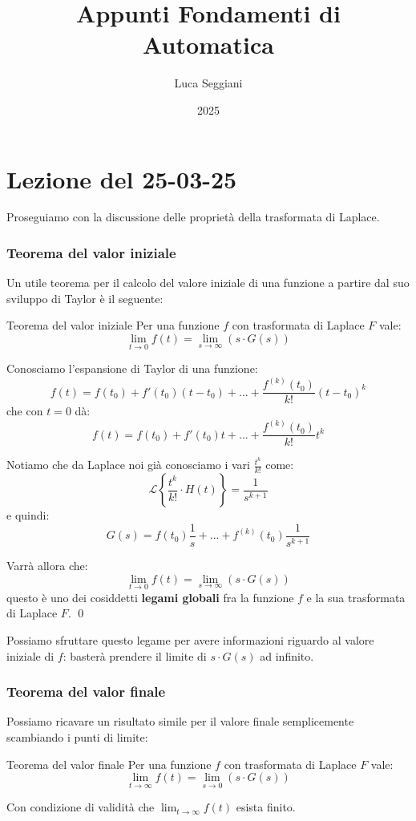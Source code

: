\documentclass[a4paper,11pt]{article}
\title{Appunti Fondamenti di Automatica}
\author{Luca Seggiani}
\date{2025}
\begin{document}
\section{Lezione del 25-03-25}

\thispagestyle{empty}
\pagestyle{fancy}

Proseguiamo con la discussione delle proprietà della trasformata di Laplace.

\subsubsection{Teorema del valor iniziale}
Un utile teorema per il calcolo del valore iniziale di una funzione a partire dal suo sviluppo di Taylor è il seguente:
\begin{theorem}{Teorema del valor iniziale}
	Per una funzione $f$ con trasformata di Laplace $F$ vale:
	$$
	\lim_{t \rightarrow 0} f(t) = \lim_{s \rightarrow \infty} (s \cdot G(s))
	$$
\end{theorem}

Conosciamo l'espansione di Taylor di una funzione:
$$
f(t) = f(t_0) + f'(t_0) (t - t_0) + ... + \frac{f^{(k)}(t_0)}{k!}(t - t_0)^k
$$
che con $t = 0$ dà:
$$
f(t) = f(t_0) + f' (t_0) t + ... + \frac{f^{(k)}(t_0)}{k!}t^k
$$

Notiamo che da Laplace noi già conosciamo i vari $\frac{t^k}{k!}$ come:
$$
\mathcal{L} \left\{ \frac{t^k}{k!} \cdot H(t) \right\} = \frac{1}{s^{k + 1}}
$$
e quindi:
$$
G(s) = f(t_0) \frac{1}{s} + ... + f^{(k)}(t_0) \frac{1}{s^{k + 1}}
$$

Varrà allora che:
$$
\lim_{t \rightarrow 0} f(t) = \lim_{s \rightarrow \infty} (s \cdot G(s))
$$
questo è uno dei cosiddetti \textbf{legami globali} fra la funzione $f$ e la sua trasformata di Laplace $F$. \qed

Possiamo sfruttare questo legame per avere informazioni riguardo al valore iniziale di $f$: basterà prendere il limite di $s \cdot G(s)$ ad infinito.

\subsubsection{Teorema del valor finale}
Possiamo ricavare un risultato simile per il valore finale semplicemente scambiando i punti di limite:
\begin{theorem}{Teorema del valor finale}
	Per una funzione $f$ con trasformata di Laplace $F$ vale:
	$$
	\lim_{t \rightarrow \infty} f(t) = \lim_{s \rightarrow 0} (s \cdot G(s))
	$$
\end{theorem}
Con condizione di validità che $\lim_{t \rightarrow \infty} f(t)$ esista finito. 
\end{document}
